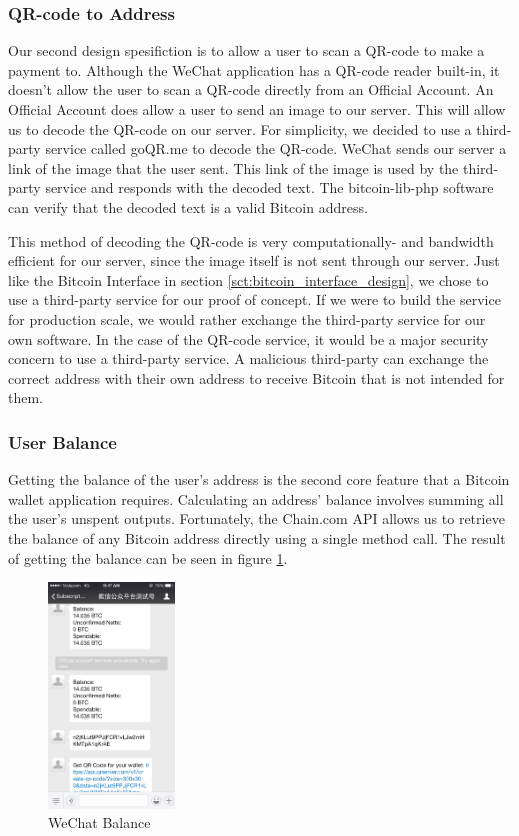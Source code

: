 \subsubsection{QR-code to Address}
Our second design spesifiction is to allow a user to scan a QR-code to make a payment to. Although the WeChat application has a QR-code reader built-in, it doesn't allow the user to scan a QR-code directly from an Official Account. An Official Account does allow a user to send an image to our server. This will allow us to decode the QR-code on our server. For simplicity, we decided to use a third-party service called goQR.me to decode the QR-code. WeChat sends our server a link of the image that the user sent. This link of the image is used by the third-party service and responds with the decoded text. The bitcoin-lib-php software can verify that the decoded text is a valid Bitcoin address.

This method of decoding the QR-code is very computationally- and bandwidth efficient for our server, since the image itself is not sent through our server. Just like the Bitcoin Interface in section \ref{sct:bitcoin_interface_design}, we chose to use a third-party service for our proof of concept. If we were to build the service for production scale, we would rather exchange the third-party service for our own software. In the case of the QR-code service, it would be a major security concern to use a third-party service. A malicious third-party can exchange the correct address with their own address to receive Bitcoin that is not intended for them.



\subsubsection{User Balance}

Getting the balance of the user's address is the second core feature that a Bitcoin wallet application requires. Calculating an address' balance involves summing all the user's unspent outputs. Fortunately, the Chain.com API allows us to retrieve the balance of any Bitcoin address directly using a single method call. The result of getting the balance can be seen in figure \ref{fig:wechat_balance}.

\begin{figure}
  \centering
    \includegraphics[width=0.3\textwidth]{figs/wechat_balance.jpg}
   \caption{WeChat Balance} 
   \label{fig:wechat_balance}
\end{figure}

